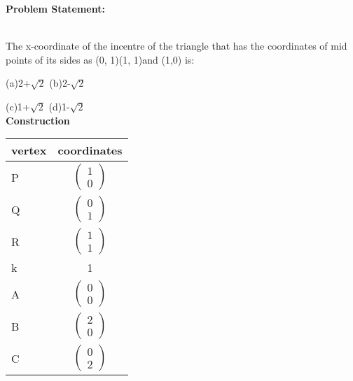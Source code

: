 \documentclass[10pt,a4paper]{report}
\begin{document}
\begin{multicols}{2}


\raggedright \textbf{Problem Statement:}\vspace{2mm}
\raggedright \\The x-coordinate of the incentre of the triangle that has the
coordinates of mid points of its sides as (0, 1)(1, 1)and (1,0) is:

(a)2+$\sqrt{2}$  \hspace{2cm} (b)2-$\sqrt{2}$ 

(c)1+$\sqrt{2}$ \hspace{2cm}  (d)1-$\sqrt{2}$\\
\vspace{5mm}
 \vspace{2mm} 
 \textbf{Construction}
\begin{center}
\setlength{\arrayrulewidth}{0.5mm}
\setlength{\tabcolsep}{6pt}
\renewcommand{\arraystretch}{1.5}
    \begin{tabular}{|l|c|}
    \hline 
    \textbf{vertex} & \textbf{coordinates} \\ \hline
  
   P & $ \begin{pmatrix} 
1 \\
0
\end{pmatrix} $ \\ \hline  
   Q & $ \begin{pmatrix} 
0 \\
1
\end{pmatrix} $ \\ \hline
   R & $ \begin{pmatrix} 
1\\
1
\end{pmatrix} $ \\ \hline
k&1\\   \hline
	A& $ \begin{pmatrix} 
0\\
0
\end{pmatrix} $ \\
 \hline
	B & $ \begin{pmatrix} 
2\\
0
\end{pmatrix} $ \\
\hline
 C & $ \begin{pmatrix} 
0 \\
2
\end{pmatrix} $ \\ \hline
      \end{tabular}
  \end{center}


\end{multicols}
\end{document}

